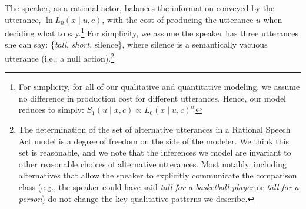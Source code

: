 \documentclass[doc, floatsintext]{apa6}
\begin{document}
The speaker, as a rational actor, balances the information conveyed by the utterance, $\ln L_{0}(x \mid u, c)$, with the cost of producing the utterance $u$ when deciding what to say.\footnote{For simplicity, for all of our qualitative and quantitative modeling, we assume no difference in production cost for different utterances. Hence, our model reduces to simply: $S_1(u \mid x, c) \propto L_{0}(x \mid u, c)^{ \alpha}$}
For simplicity, we assume the speaker has three utterances she can say: \{\emph{tall}, \emph{short}, silence\}, where silence is a semantically vacuous utterance (i.e., a null action).\footnote{The determination of the set of alternative utterances in a Rational Speech Act model is a degree of freedom on the side of the modeler. We think this set is reasonable, and we note that the inferences we model are invariant to other reasonable choices of alternative utterances. Most notably, including alternatives that allow the speaker to explicitly communicate the comparison class (e.g., the speaker could have said \emph{tall for a basketball player} or \emph{tall for a person}) do not change the key qualitative patterns we describe.
}
\end{document}
